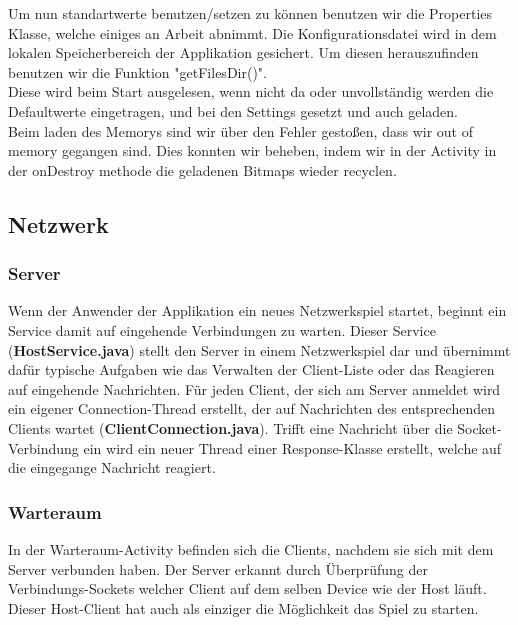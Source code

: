 \documentclass[11pt,a4paper]{article}
\begin{document}
Um nun standartwerte benutzen/setzen zu können benutzen wir die Properties Klasse, welche einiges an Arbeit abnimmt. Die Konfigurationsdatei wird in dem lokalen Speicherbereich der Applikation gesichert. Um diesen herauszufinden benutzen wir die Funktion "getFilesDir()". \\

Diese wird beim Start ausgelesen, wenn nicht da oder unvollständig werden die Defaultwerte eingetragen, und bei den Settings gesetzt und auch geladen. \\

Beim laden des Memorys sind wir über den Fehler gestoßen, dass wir out of memory gegangen sind. Dies konnten wir beheben, indem wir in der Activity in der onDestroy methode die geladenen  Bitmaps wieder recyclen. \\

\subsection{Netzwerk}
\subsubsection{Server}
Wenn der Anwender der Applikation ein neues Netzwerkspiel startet, beginnt ein Service damit auf eingehende Verbindungen zu warten. Dieser Service (\textbf{HostService.java}) stellt den Server in einem Netzwerkspiel dar und übernimmt dafür typische Aufgaben wie das Verwalten der Client-Liste oder das Reagieren auf eingehende Nachrichten. Für jeden Client, der sich am Server anmeldet wird ein eigener Connection-Thread erstellt, der auf Nachrichten des entsprechenden Clients wartet (\textbf{ClientConnection.java}). Trifft eine Nachricht über die Socket-Verbindung ein wird ein neuer Thread einer Response-Klasse erstellt, welche auf die eingegange Nachricht reagiert.
\subsubsection{Warteraum}
In der Warteraum-Activity befinden sich die Clients, nachdem sie sich mit dem Server verbunden haben. Der Server erkannt durch Überprüfung der Verbindungs-Sockets welcher Client auf dem selben Device wie der Host läuft. Dieser Host-Client hat auch als einziger die Möglichkeit das Spiel zu starten.
\end{document}
